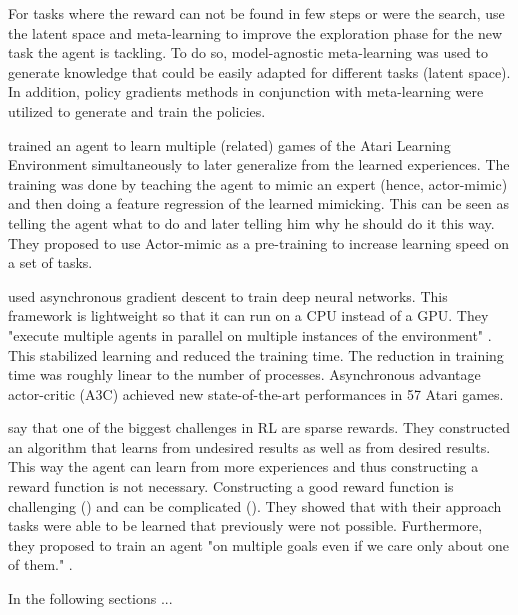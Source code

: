 For tasks where the reward can not be found in few steps or were the search, \citet{MAESN} use the latent space and meta-learning to improve the exploration phase for the new task the agent is tackling. To do so, model-agnostic meta-learning was used to generate knowledge that could be easily adapted for different tasks (latent space). In addition, policy gradients methods in conjunction with meta-learning were utilized to generate and train the policies. 

\citet{parisotto2015actor} trained an agent to learn multiple (related) games of the Atari Learning Environment simultaneously to later generalize from the learned experiences. The training was done by teaching the agent to mimic an expert (hence, actor-mimic) and then doing a feature regression of the learned mimicking. This can be seen as telling the agent what to do and later telling him why he should do it this way. They proposed to use Actor-mimic as a pre-training to increase learning speed on a set of tasks.

\citet{mnih2016asynchronous} used asynchronous gradient descent to train deep neural networks. This framework is lightweight so that it can run on a CPU instead of a GPU. They "execute multiple agents in parallel on multiple instances of the environment" \citet{mnih2016asynchronous}. This stabilized learning and reduced the training time. The reduction in training time was roughly linear to the number of processes. Asynchronous advantage actor-critic (A3C) achieved new state-of-the-art performances in 57 Atari games.

\citet{andrychowicz2017hindsight} say that one of the biggest challenges in RL are sparse rewards. They constructed an algorithm that learns from undesired results as well as from desired results. This way the agent can learn from more experiences and thus constructing a reward function is not necessary. Constructing a good reward function is challenging (\cite{ng1999policy}) and can be complicated (\cite{popov2017data}). They showed that with their approach tasks were able to be learned that previously were not possible. Furthermore, they proposed to train an agent "on multiple goals even if we care only about one of them." \citet{andrychowicz2017hindsight}.

In the following sections ...